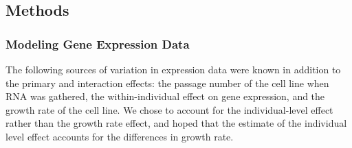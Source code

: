 \subsection{Methods}\label{sec:org53944c4}


\subsubsection{Modeling Gene Expression Data}\label{sec:orgc908098}



The following sources of variation in expression data were known in addition to the primary and interaction effects: the passage number of the cell line when RNA was gathered,
the within-individual effect on gene expression, and the growth rate of the cell line.  We chose to account for the individual-level effect rather than the growth rate effect, and hoped that the estimate of the individual level effect accounts for the differences in growth rate. 

